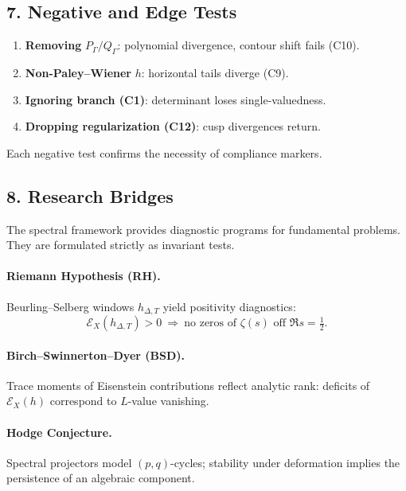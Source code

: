 \subsection*{7. Negative and Edge Tests}\relax\hspace{0pt}

\begin{enumerate}[label=(\alph*)]
\item \textbf{Removing } $P_\Gamma/Q_\Gamma$: polynomial divergence, contour shift fails (C10).
\item \textbf{Non-Paley–Wiener } $h$: horizontal tails diverge (C9).
\item \textbf{Ignoring branch (C1)}: determinant loses single-valuedness.
\item \textbf{Dropping regularization (C12)}: cusp divergences return.
\end{enumerate}
Each negative test confirms the necessity of compliance markers.

\subsection*{8. Research Bridges}\relax\hspace{0pt}

The spectral framework provides diagnostic programs for fundamental problems.
They are formulated strictly as invariant tests.

\paragraph{Riemann Hypothesis (RH).}
Beurling–Selberg windows $h_{\Delta,T}$ yield positivity diagnostics:
\[
\mathcal{E}_X(h_{\Delta,T})>0
\ \Rightarrow\
\text{no zeros of }\zeta(s)\text{ off }\Re s=\tfrac{1}{2}.
\]

\paragraph{Birch–Swinnerton–Dyer (BSD).}
Trace moments of Eisenstein contributions reflect analytic rank:
deficits of $\mathcal{E}_X(h)$ correspond to $L$-value vanishing.

\paragraph{Hodge Conjecture.}
Spectral projectors model $(p,q)$-cycles; stability under deformation implies
the persistence of an algebraic component.

